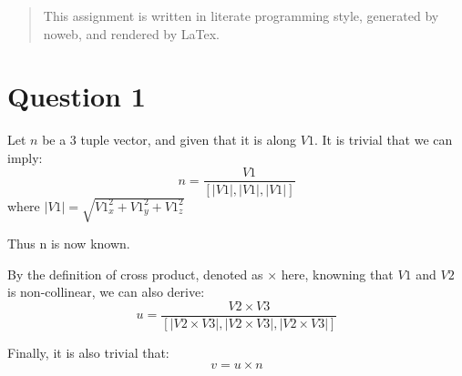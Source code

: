\documentclass[12pt]{article}
\begin{document}
\maketitle

\begin{abstract}
  This assignment is written in literate programming style, generated by noweb, and rendered by LaTex.
\end{abstract}

\section{Question 1}
Let $n$ be a 3 tuple vector, and given that it is along $V1$. It is trivial that  we can imply:
\[
        n = \frac{V1}{[|V1|,|V1|,|V1|]}
\]
where $|V1| = \sqrt{V1_x^2+V1_y^2+V1_z^2}$

Thus n is now known.

By the definition of cross product, denoted as $\times$ here, knowning that $V1$ and $V2$ is non-collinear, we can also derive:
\[
        u = \frac{V2 \times V3}{[|V2 \times V3|,|V2 \times V3|,|V2 \times V3|]}
\]

Finally, it is also trivial that:
\[
        v = u \times n
\]
\end{document}
